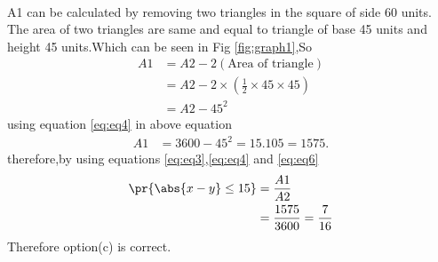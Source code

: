 \documentclass[journal,12pt,twocolumn]{IEEEtran}
\begin{document}
\begin{enumerate}
\begin{align}
    \label{eq:eq4}
\end{align}
A1 can be calculated by removing two triangles in the square of side 60 units. The area of two triangles are same and equal to 
triangle of base 45 units and height 45 units.Which can be seen in Fig \ref{fig:graph1},So
\begin{align}
    A1&=A2-2(\text{Area of triangle})
    \\
    &=A2-2\times(\frac{1}{2}\times45\times45)
    \\
    &=A2 -45^{2}
    \label{eq:eq5}
\end{align}
using equation \eqref{eq:eq4} in above equation
\begin{align}
    A1&=3600-45^{2}=15.105=1575 .
    \label{eq:eq6}
\end{align}
therefore,by using equations \eqref{eq:eq3},\eqref{eq:eq4} and \eqref{eq:eq6}
\begin{align}
    \pr{\abs{x - y}\leq15}&=\frac{A1}{A2}
    \\
    &=\frac{1575}{3600}=\frac{7}{16}
\end{align}
 Therefore option(c) is correct.
\end{enumerate}
\end{document}
